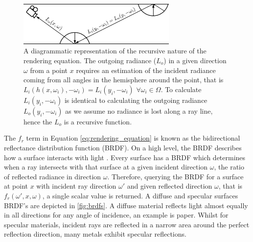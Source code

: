 \documentclass[../dissertation.tex]{subfiles}
\begin{document}
\begin{figure}[h]
\begin{center}
\includegraphics[width=0.7\textwidth]{images/rendering_equation.png}    
\end{center}
\caption{A diagrammatic representation of the recursive nature of the rendering equation. The outgoing radiance ($L_o$) in a given direction $\omega$ from a point $x$ requires an estimation of the incident radiance coming from all angles in the hemisphere around the point, that is $L_i(h(x, \omega_i),-\omega_i) = L_i(y_i, -\omega_i)$ $\forall \omega_i \in \Omega$. To calculate $L_i(y_i, -\omega_i)$ is identical to calculating the outgoing radiance $L_o(y_i, -\omega_i)$ as we assume no radiance is lost along a ray line, hence the $L_o$ is a recursive function. }
\label{fig:recursive_rendering}
\end{figure}

The $f_r$ term in Equation \ref{eq:rendering_equation} is known as the bidirectional reflectance distribution function (BRDF). On a high level, the BRDF describes how a surface interacts with light \cite{glassner2014principles}. Every surface has a BRDF which determines when a ray intersects with that surface at a given incident direction $\omega$, the ratio of reflected radiance in direction $\omega$. Therefore, querying the BRDF for a surface at point $x$ with incident ray direction $\omega'$ and given reflected direction $\omega$, that is $f_r(\omega', x , \omega)$,  a single scalar value is returned. A diffuse and specular surfaces BRDF's are depicted in \ref{fig:brdfs}. A diffuse material reflects light almost equally in all directions for any angle of incidence, an example is paper. Whilst for specular materials, incident rays are reflected in a narrow area around the perfect reflection direction, many metals exhibit specular reflections.
\end{document}
